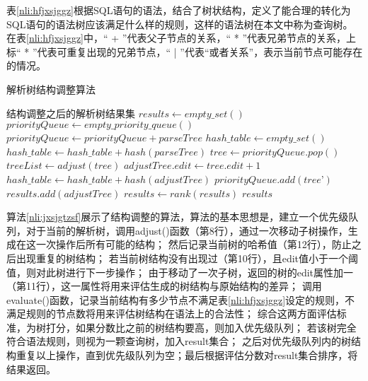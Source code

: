 表\ref{nli:hfjxsjggz}根据SQL语句的语法，结合了树状结构，定义了能合理的转化为SQL语句的语法树应该满足什么样的规则，这样的语法树在本文中称为查询树。
在表\ref{nli:hfjxsjggz}中，“ + ”代表父子节点的关系，“ * ”代表兄弟节点的关系，上标“ * ”代表可重复出现的兄弟节点，“ | ”代表“或者关系”，表示当前节点可能存在的情况。
\begin{algorithm}
    \caption{解析树结构调整算法}
    \label{nli:jxsjgtzsf}
    \begin{algorithmic}[1] %
    \Ensure 结构调整之后的解析树结果集 %
    \State $results \gets empty\_set()$
    \State $priorityQueue \gets empty\_priority\_queue()$
    \State $priorityQueue \gets priorityQueue + parseTree$
    \State $hash\_table \gets empty\_set()$
    \State $hash\_table \gets hash\_table +hash(parseTree)$
        \State $tree \gets priorityQueue.pop()$
        \State $treeList \gets adjust(tree)$
            \State $adjustTree.edit \gets tree.edit + 1$
            \State $hash\_table \gets hash\_table + hash(adjustTree)$
                \State $priorityQueue.add(tree’)$
            \EndIf
                \State $results.add(adjustTree)$
            \EndIf
        \EndIf
        \EndFor
    \EndWhile
    \State $results \gets rank(results)$
    \State \Return$results$
    \end{algorithmic}
    \end{algorithm}

算法\ref{nli:jxsjgtzsf}展示了结构调整的算法，算法的基本思想是，建立一个优先级队列，对于当前的解析树，调用adjust()函数（第8行），通过一次移动子树操作，生成在这一次操作后所有可能的结构；
然后记录当前树的哈希值（第12行），防止之后出现重复的树结构；
若当前树结构没有出现过（第10行），且edit值小于一个阈值，则对此树进行下一步操作；
由于移动了一次子树，返回的树的edit属性加一（第11行），这一属性将用来评估生成的树结构与原始结构的差异；
调用evaluate()函数，记录当前结构有多少节点不满足表\ref{nli:hfjxsjggz}设定的规则，不满足规则的节点数将用来评估树结构在语法上的合法性；
综合这两方面评估标准，为树打分，如果分数比之前的树结构要高，则加入优先级队列；
若该树完全符合语法规则，则视为一颗查询树，加入result集合；
之后对优先级队列内的树结构重复以上操作，直到优先级队列为空；最后根据评估分数对result集合排序，将结果返回。

